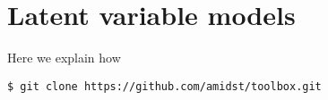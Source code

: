 \documentclass[10pt,a4paper]{article}
\begin{document}
\section{Latent variable models}

Here we explain how 


\begin{verbatim}
$ git clone https://github.com/amidst/toolbox.git      
\end{verbatim}
\end{document}

